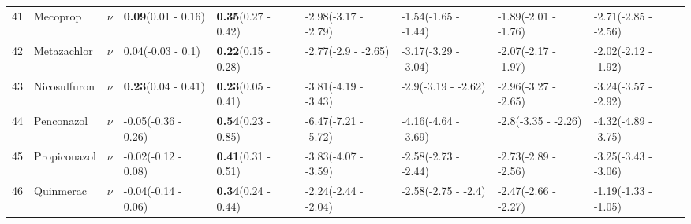 \begin{longtable}{lp{2cm}p{0.6cm}p{1.8cm}p{1.8cm}p{1.8cm}p{1.8cm}p{1.8cm}p{1.8cm}}
  41 & Mecoprop & $\nu$ & \textbf{0.09}\newline (0.01 - 0.16) & \textbf{0.35}\newline (0.27 - 0.42) & -2.98\newline (-3.17 - -2.79) & -1.54\newline (-1.65 - -1.44) & -1.89\newline (-2.01 - -1.76) & -2.71\newline (-2.85 - -2.56) \\ 
  42 & Metazachlor & $\nu$ & 0.04\newline (-0.03 - 0.1) & \textbf{0.22}\newline (0.15 - 0.28) & -2.77\newline (-2.9 - -2.65) & -3.17\newline (-3.29 - -3.04) & -2.07\newline (-2.17 - -1.97) & -2.02\newline (-2.12 - -1.92) \\ 
  43 & Nicosulfuron & $\nu$ & \textbf{0.23}\newline (0.04 - 0.41) & \textbf{0.23}\newline (0.05 - 0.41) & -3.81\newline (-4.19 - -3.43) & -2.9\newline (-3.19 - -2.62) & -2.96\newline (-3.27 - -2.65) & -3.24\newline (-3.57 - -2.92) \\ 
  44 & Penconazol & $\nu$ & -0.05\newline (-0.36 - 0.26) & \textbf{0.54}\newline (0.23 - 0.85) & -6.47\newline (-7.21 - -5.72) & -4.16\newline (-4.64 - -3.69) & -2.8\newline (-3.35 - -2.26) & -4.32\newline (-4.89 - -3.75) \\ 
  45 & Propiconazol & $\nu$ & -0.02\newline (-0.12 - 0.08) & \textbf{0.41}\newline (0.31 - 0.51) & -3.83\newline (-4.07 - -3.59) & -2.58\newline (-2.73 - -2.44) & -2.73\newline (-2.89 - -2.56) & -3.25\newline (-3.43 - -3.06) \\ 
  46 & Quinmerac & $\nu$ & -0.04\newline (-0.14 - 0.06) & \textbf{0.34}\newline (0.24 - 0.44) & -2.24\newline (-2.44 - -2.04) & -2.58\newline (-2.75 - -2.4) & -2.47\newline (-2.66 - -2.27) & -1.19\newline (-1.33 - -1.05) \\ 

\end{longtable}
